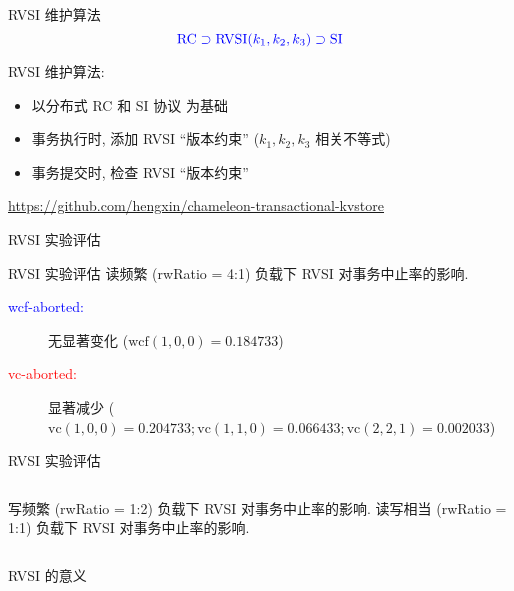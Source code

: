 \begin{frame}{RVSI 维护算法}
  \[
    \textcolor{blue}{\text{RC} \supset \text{RVSI}(k_1, k_2, k_3) \supset \text{SI}}
  \]

  \vspace{0.10cm}

  RVSI 维护算法:
  \begin{itemize}
    \item 以分布式 RC 和 SI 协议 为基础
    \item 事务执行时, 添加 RVSI ``版本约束'' ($k_1, k_2, k_3$ 相关不等式)
    \item 事务提交时, 检查 RVSI ``版本约束''
  \end{itemize}

  \textcolor{red}{\small \url{https://github.com/hengxin/chameleon-transactional-kvstore}}
\end{frame}
\begin{frame}{RVSI 实验评估}
  
\end{frame}
\begin{frame}{RVSI 实验评估}
	{读频繁 (rwRatio = 4:1) 负载下 RVSI 对事务中止率的影响.}

  \begin{description}
	\item[\textcolor{blue}{wcf-aborted:}] 
	  无显著变化 {\small ($\text{wcf}(1,0,0) = 0.184733$)}
	\item[\textcolor{red}{vc-aborted:}] 显著减少 
	  {\small ($\text{vc}(1,0,0) = 0.204733;
	  \text{vc}(1,1,0) = 0.066433;
	  \text{vc}(2,2,1) = 0.002033$)}
  \end{description}
\end{frame}
\begin{frame}{RVSI 实验评估}
  \begin{columns}
		{写频繁 (rwRatio = 1:2) 负载下 RVSI 对事务中止率的影响.}
		{读写相当 (rwRatio = 1:1) 负载下 RVSI 对事务中止率的影响.}
  \end{columns}
\end{frame}
\begin{frame}{RVSI 的意义}
\end{frame}
